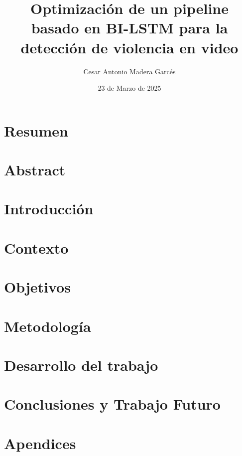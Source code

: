 \documentclass[11pt,a4paper,spanish]{book}
\title{Optimización de un pipeline basado en BI-LSTM para la detección de violencia en video}
\author{Cesar Antonio Madera Garcés}
\date{23 de Marzo de 2025}
\numberwithin{equation}{chapter}
\numberwithin{figure}{chapter}
\begin{document}
\renewcommand{\listfigurename}{Índice de Ilustraciones}
\renewcommand{\listtablename}{Índice de Tablas}
\renewcommand{\contentsname}{Índice de Contenidos}
\renewcommand{\figurename}{Figura}
\renewcommand{\tablename}{Tabla} 

\maketitle

\frontmatter
\tableofcontents
\listoffigures
\listoftables

\chapter{Resumen}




\chapter{Abstract}


\mainmatter
\chapter{Introducción}



\chapter{Contexto}


\chapter{Objetivos}
\label{objetivos}

\chapter{Metodología}


\chapter{Desarrollo del trabajo}


\chapter{Conclusiones y Trabajo Futuro}





\appendix
\chapter{Apendices}
\end{document}
